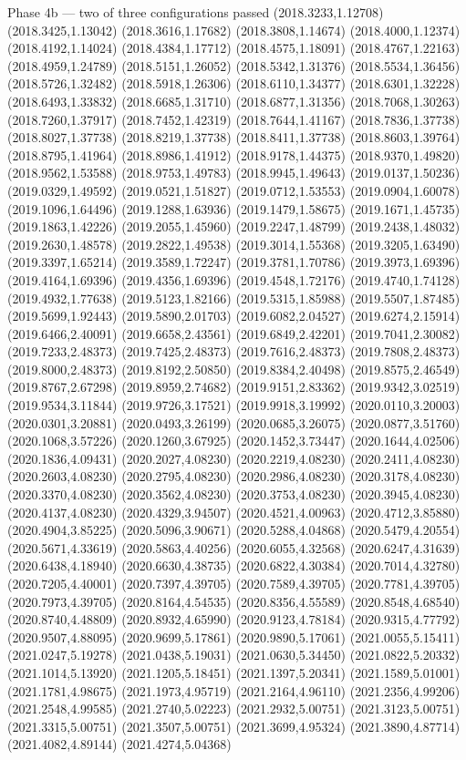 \documentclass[aspectratio=169,10pt]{beamer}
\begin{document}
\begin{frame}[t]{Phase 4b — two of three configurations passed}
(2018.3233,1.12708) (2018.3425,1.13042) (2018.3616,1.17682) (2018.3808,1.14674) (2018.4000,1.12374) (2018.4192,1.14024) (2018.4384,1.17712) (2018.4575,1.18091) (2018.4767,1.22163) (2018.4959,1.24789) (2018.5151,1.26052) (2018.5342,1.31376) (2018.5534,1.36456) (2018.5726,1.32482) (2018.5918,1.26306) (2018.6110,1.34377) (2018.6301,1.32228) (2018.6493,1.33832) (2018.6685,1.31710) (2018.6877,1.31356) (2018.7068,1.30263) (2018.7260,1.37917) (2018.7452,1.42319) (2018.7644,1.41167) (2018.7836,1.37738) (2018.8027,1.37738) (2018.8219,1.37738) (2018.8411,1.37738) (2018.8603,1.39764) (2018.8795,1.41964) (2018.8986,1.41912) (2018.9178,1.44375) (2018.9370,1.49820) (2018.9562,1.53588) (2018.9753,1.49783) (2018.9945,1.49643) (2019.0137,1.50236) (2019.0329,1.49592) (2019.0521,1.51827) (2019.0712,1.53553) (2019.0904,1.60078) (2019.1096,1.64496) (2019.1288,1.63936) (2019.1479,1.58675) (2019.1671,1.45735) (2019.1863,1.42226) (2019.2055,1.45960) (2019.2247,1.48799) (2019.2438,1.48032) (2019.2630,1.48578) (2019.2822,1.49538) (2019.3014,1.55368) (2019.3205,1.63490) (2019.3397,1.65214) (2019.3589,1.72247) (2019.3781,1.70786) (2019.3973,1.69396) (2019.4164,1.69396) (2019.4356,1.69396) (2019.4548,1.72176) (2019.4740,1.74128) (2019.4932,1.77638) (2019.5123,1.82166) (2019.5315,1.85988) (2019.5507,1.87485) (2019.5699,1.92443) (2019.5890,2.01703) (2019.6082,2.04527) (2019.6274,2.15914) (2019.6466,2.40091) (2019.6658,2.43561) (2019.6849,2.42201) (2019.7041,2.30082) (2019.7233,2.48373) (2019.7425,2.48373) (2019.7616,2.48373) (2019.7808,2.48373) (2019.8000,2.48373) (2019.8192,2.50850) (2019.8384,2.40498) (2019.8575,2.46549) (2019.8767,2.67298) (2019.8959,2.74682) (2019.9151,2.83362) (2019.9342,3.02519) (2019.9534,3.11844) (2019.9726,3.17521) (2019.9918,3.19992) (2020.0110,3.20003) (2020.0301,3.20881) (2020.0493,3.26199) (2020.0685,3.26075) (2020.0877,3.51760) (2020.1068,3.57226) (2020.1260,3.67925) (2020.1452,3.73447) (2020.1644,4.02506) (2020.1836,4.09431) (2020.2027,4.08230) (2020.2219,4.08230) (2020.2411,4.08230) (2020.2603,4.08230) (2020.2795,4.08230) (2020.2986,4.08230) (2020.3178,4.08230) (2020.3370,4.08230) (2020.3562,4.08230) (2020.3753,4.08230) (2020.3945,4.08230) (2020.4137,4.08230) (2020.4329,3.94507) (2020.4521,4.00963) (2020.4712,3.85880) (2020.4904,3.85225) (2020.5096,3.90671) (2020.5288,4.04868) (2020.5479,4.20554) (2020.5671,4.33619) (2020.5863,4.40256) (2020.6055,4.32568) (2020.6247,4.31639) (2020.6438,4.18940) (2020.6630,4.38735) (2020.6822,4.30384) (2020.7014,4.32780) (2020.7205,4.40001) (2020.7397,4.39705) (2020.7589,4.39705) (2020.7781,4.39705) (2020.7973,4.39705) (2020.8164,4.54535) (2020.8356,4.55589) (2020.8548,4.68540) (2020.8740,4.48809) (2020.8932,4.65990) (2020.9123,4.78184) (2020.9315,4.77792) (2020.9507,4.88095) (2020.9699,5.17861) (2020.9890,5.17061) (2021.0055,5.15411) (2021.0247,5.19278) (2021.0438,5.19031) (2021.0630,5.34450) (2021.0822,5.20332) (2021.1014,5.13920) (2021.1205,5.18451) (2021.1397,5.20341) (2021.1589,5.01001) (2021.1781,4.98675) (2021.1973,4.95719) (2021.2164,4.96110) (2021.2356,4.99206) (2021.2548,4.99585) (2021.2740,5.02223) (2021.2932,5.00751) (2021.3123,5.00751) (2021.3315,5.00751) (2021.3507,5.00751) (2021.3699,4.95324) (2021.3890,4.87714) (2021.4082,4.89144) (2021.4274,5.04368) 
\end{frame}
\end{document}
